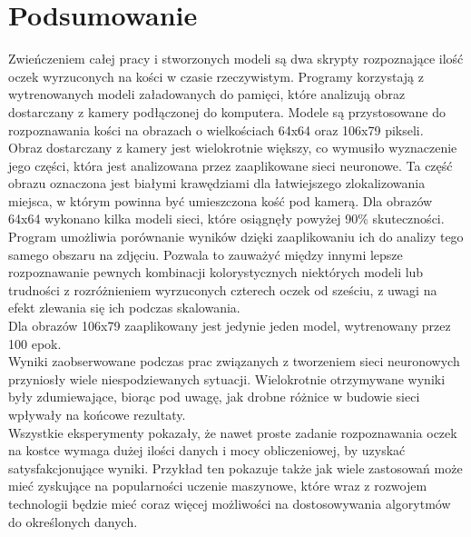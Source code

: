 
\chapter{Podsumowanie}

Zwieńczeniem całej pracy i stworzonych modeli są dwa skrypty rozpoznające ilość
oczek wyrzuconych na kości w czasie rzeczywistym. Programy korzystają z wytrenowanych
modeli załadowanych do pamięci, które analizują obraz dostarczany z kamery
podłączonej do komputera. Modele są przystosowane do rozpoznawania kości na
obrazach o wielkościach 64x64 oraz 106x79 pikseli.\\
Obraz dostarczany z kamery jest wielokrotnie większy, co wymusiło wyznaczenie jego
części, która jest analizowana przez zaaplikowane sieci neuronowe. Ta część obrazu
oznaczona jest białymi krawędziami dla łatwiejszego zlokalizowania miejsca, w którym
powinna być umieszczona kość pod kamerą.
Dla obrazów 64x64 wykonano kilka modeli sieci, które osiągnęły powyżej 90\% skuteczności.
Program umożliwia porównanie wyników dzięki zaaplikowaniu ich do analizy tego
samego obszaru na zdjęciu. Pozwala to zauważyć między innymi lepsze rozpoznawanie
pewnych kombinacji kolorystycznych niektórych modeli lub trudności z rozróżnieniem
wyrzuconych czterech oczek od sześciu, z uwagi na efekt zlewania się ich podczas
skalowania.\\
Dla obrazów 106x79 zaaplikowany jest jedynie jeden model, wytrenowany przez 100 epok.\\
Wyniki zaobserwowane podczas prac związanych z tworzeniem sieci neuronowych przyniosły
wiele niespodziewanych sytuacji. Wielokrotnie otrzymywane wyniki były zdumiewające,
biorąc pod uwagę, jak drobne różnice w budowie sieci wpływały na końcowe rezultaty.\\
Wszystkie eksperymenty pokazały, że nawet proste zadanie rozpoznawania oczek na kostce
wymaga dużej ilości danych i mocy obliczeniowej, by uzyskać satysfakcjonujące wyniki.
Przykład ten pokazuje także jak wiele zastosowań może mieć zyskujące na popularności
uczenie maszynowe, które wraz z rozwojem technologii będzie mieć coraz więcej możliwości
na dostosowywania algorytmów do określonych danych.

